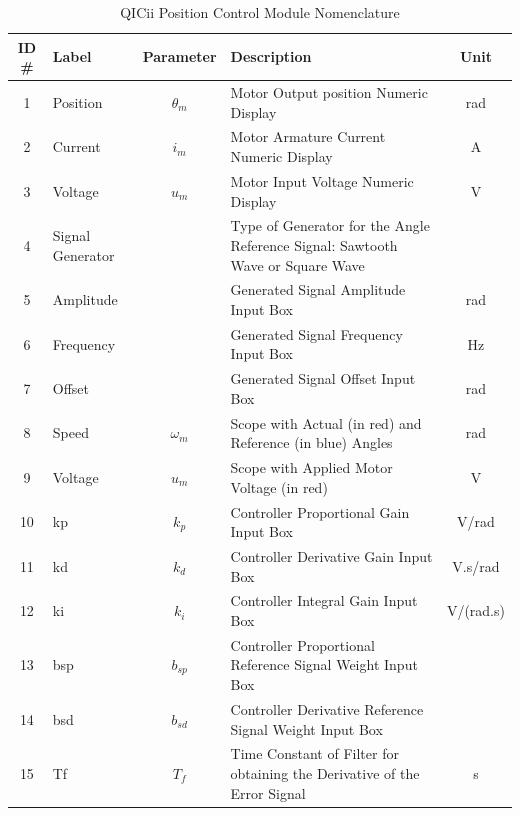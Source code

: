 \documentclass{article}
\begin{document}
\begin{table}[h!]
    \centering
    \begin{tabular}{|c|l|c|p{5.5cm}|c|}
    \hline
    \textbf{ID \#} & \textbf{Label} & \textbf{Parameter} & \textbf{Description} & \textbf{Unit} \\ \hline
    1  & Position    & $\theta_m$  & Motor Output position Numeric Display     & rad   \\ \hline
    2  & Current     & $i_m$       & Motor Armature Current Numeric Display    & A     \\ \hline
    3  & Voltage     & $u_m$       & Motor Input Voltage Numeric Display       & V     \\ \hline
    4  & Signal Generator & & Type of Generator for the Angle Reference Signal: Sawtooth Wave or Square Wave & \\ \hline
    5  & Amplitude   &             & Generated Signal Amplitude Input Box      & rad   \\ \hline
    6  & Frequency   &             & Generated Signal Frequency Input Box      & Hz    \\ \hline
    7  & Offset      &             & Generated Signal Offset Input Box         & rad   \\ \hline
    8  & Speed       & $\omega_m$  & Scope with Actual (in red) and Reference (in blue) Angles & rad \\ \hline
    9  & Voltage     & $u_m$       & Scope with Applied Motor Voltage (in red) & V     \\ \hline
    10 & kp          & $k_p$       & Controller Proportional Gain Input Box     & V/rad \\ \hline
    11 & kd          & $k_d$       & Controller Derivative Gain Input Box       & V.s/rad \\ \hline
    12 & ki          & $k_i$       & Controller Integral Gain Input Box         & V/(rad.s) \\ \hline
    13 & bsp         & $b_{sp}$    & Controller Proportional Reference Signal Weight Input Box & \\ \hline
    14 & bsd         & $b_{sd}$    & Controller Derivative Reference Signal Weight Input Box   & \\ \hline
    15 & Tf          & $T_f$       & Time Constant of Filter for obtaining the Derivative of the Error Signal & s \\ \hline
    \end{tabular}
    \caption{QICii Position Control Module Nomenclature}
\end{table}
\end{document}
